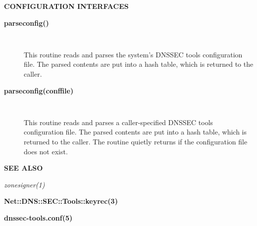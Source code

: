{\bf CONFIGURATION INTERFACES}

\begin{description}

\item [{\bf parseconfig()}]\verb" "

This routine reads and parses the system's DNSSEC tools configuration file.
The parsed contents are put into a hash table, which is returned to the caller.

\item [{\bf parseconfig(conffile)}]\verb" "

This routine reads and parses a caller-specified DNSSEC tools configuration
file.  The parsed contents are put into a hash table, which is returned to
the caller.  The routine quietly returns if the configuration file does not
exist. 

\end{description}

{\bf SEE ALSO}

{\it zonesigner(1)}

{\bf Net::DNS::SEC::Tools::keyrec(3)}

{\bf dnssec-tools.conf(5)}

